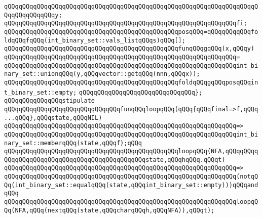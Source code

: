 \verb|qQQqqQQqqQQqqQQqqQQqqQQqqQQqqQQqqQQqqQQqqQQqqQQqqQQqqQQqqQQqqQQqqQQqqQQqqQQqqQQqqQQqy;|\newline
\verb|qQQqqQQqqQQqqQQqqQQqqQQqqQQqqQQqqQQqqQQqqQQqqQQqqQQqqQQqqQQqqQQqfi;|\newline
\newline
\verb|qQQqqQQqqQQqqQQqqQQqqQQqqQQqqQQqqQQqqQQqqQQqqQQqposqQQq=qQQqqQQqqQQqfoldqQQqfqQQq(int_binary_set::vals_listqQQqs)qQQq[];|\newline
\newline
\verb|qQQqqQQqqQQqqQQqqQQqqQQqqQQqqQQqqQQqqQQqqQQqqQQqfunqQQqgqQQq(x,qQQqy)|\newline
\verb|qQQqqQQqqQQqqQQqqQQqqQQqqQQqqQQqqQQqqQQqqQQqqQQqqQQqqQQqqQQqqQQq=|\newline
\verb|qQQqqQQqqQQqqQQqqQQqqQQqqQQqqQQqqQQqqQQqqQQqqQQqqQQqqQQqqQQqqQQqint_binary_set::unionqQQq(y,qQQqvector::getqQQq(nnn,qQQqx));|\newline
\newline
\verb|qQQqqQQqqQQqqQQqqQQqqQQqqQQqqQQqqQQqqQQqqQQqqQQqfoldqQQqgqQQqposqQQqint_binary_set::empty;|\newline
\verb|qQQqqQQqqQQqqQQqqQQqqQQqqQQqqQQq};|\newline
\newline
\newline
\verb|qQQqqQQqqQQqqQQqstipulate|\newline
\newline
\verb|qQQqqQQqqQQqqQQqqQQqqQQqqQQqqQQqfunqQQqloopqQQq(qQQq{qQQqfinal=>f,qQQq...qQQq},qQQqstate,qQQqNIL)|\newline
\verb|qQQqqQQqqQQqqQQqqQQqqQQqqQQqqQQqqQQqqQQqqQQqqQQqqQQqqQQqqQQqqQQq=>|\newline
\verb|qQQqqQQqqQQqqQQqqQQqqQQqqQQqqQQqqQQqqQQqqQQqqQQqqQQqqQQqqQQqqQQqint_binary_set::memberqQQq(state,qQQqf);qQQq|\newline
\newline
\verb|qQQqqQQqqQQqqQQqqQQqqQQqqQQqqQQqqQQqqQQqqQQqqQQqloopqQQq(NFA,qQQqqQQqqQQqqQQqqQQqqQQqqQQqqQQqqQQqqQQqqQQqqQQqstate,qQQqhqQQq.qQQqt)|\newline
\verb|qQQqqQQqqQQqqQQqqQQqqQQqqQQqqQQqqQQqqQQqqQQqqQQqqQQqqQQqqQQqqQQq=>|\newline
\verb|qQQqqQQqqQQqqQQqqQQqqQQqqQQqqQQqqQQqqQQqqQQqqQQqqQQqqQQqqQQqqQQq(notqQQq(int_binary_set::equalqQQq(state,qQQqint_binary_set::empty)))qQQqandqQQq|\newline
\verb|qQQqqQQqqQQqqQQqqQQqqQQqqQQqqQQqqQQqqQQqqQQqqQQqqQQqqQQqqQQqqQQqloopqQQq(NFA,qQQq(nextqQQq(state,qQQqcharqQQqh,qQQqNFA)),qQQqt);|\newline

